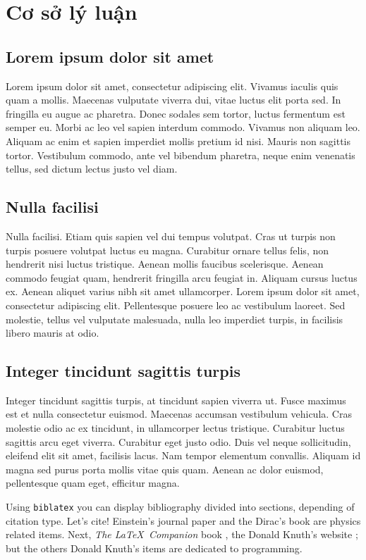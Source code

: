 \chapter{Cơ sở lý luận}

\section{Lorem ipsum dolor sit amet}
Lorem ipsum dolor sit amet, consectetur adipiscing elit. Vivamus iaculis quis quam a mollis. Maecenas vulputate viverra dui, vitae luctus elit porta sed. In fringilla eu augue ac pharetra. Donec sodales sem tortor, luctus fermentum est semper eu. Morbi ac leo vel sapien interdum commodo. Vivamus non aliquam leo. Aliquam ac enim et sapien imperdiet mollis pretium id nisi. Mauris non sagittis tortor. Vestibulum commodo, ante vel bibendum pharetra, neque enim venenatis tellus, sed dictum lectus justo vel diam.\par
\section{Nulla facilisi}
Nulla facilisi. Etiam quis sapien vel dui tempus volutpat. Cras ut turpis non turpis posuere volutpat luctus eu magna. Curabitur ornare tellus felis, non hendrerit nisi luctus tristique. Aenean mollis faucibus scelerisque. Aenean commodo feugiat quam, hendrerit fringilla arcu feugiat in. Aliquam cursus luctus ex. Aenean aliquet varius nibh sit amet ullamcorper. Lorem ipsum dolor sit amet, consectetur adipiscing elit. Pellentesque posuere leo ac vestibulum laoreet. Sed molestie, tellus vel vulputate malesuada, nulla leo imperdiet turpis, in facilisis libero mauris at odio.\par
\section{Integer tincidunt sagittis turpis}
Integer tincidunt sagittis turpis, at tincidunt sapien viverra ut. Fusce maximus est et nulla consectetur euismod. Maecenas accumsan vestibulum vehicula. Cras molestie odio ac ex tincidunt, in ullamcorper lectus tristique. Curabitur luctus sagittis arcu eget viverra. Curabitur eget justo odio. Duis vel neque sollicitudin, eleifend elit sit amet, facilisis lacus. Nam tempor elementum convallis. Aliquam id magna sed purus porta mollis vitae quis quam. Aenean ac dolor euismod, pellentesque quam eget, efficitur magna.\par

Using \texttt{biblatex} you can display bibliography divided into sections, 
depending of citation type. 
Let's cite! Einstein's journal paper \cite{bai-bao-1} and the Dirac's 
book \cite{sach-1} are physics related items. 
Next, \textit{The \LaTeX\ Companion} book \cite{website-1}, the Donald Knuth's website \cite{sach-2}; but the others Donald Knuth's items \cite{bai-bao-1} are dedicated to programming.
